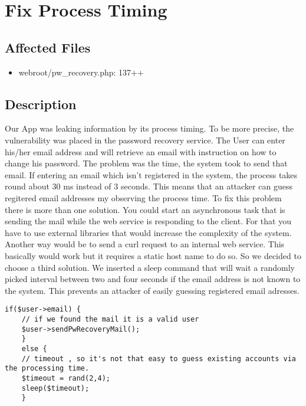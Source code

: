 \chapter{Fix Process Timing}
\section{Affected Files}
\begin{itemize}
	\item webroot/pw\_recovery.php: 137++
\end{itemize}
\section{Description}

Our App was leaking information by its process timing. To be more precise, the vulnerability was placed in the password recovery service. The User can enter his/her email address and will retrieve an email with instruction on how to change his password. The problem was the time, the system took to send that email. If entering an email which isn't registered in the system, the process takes round about 30 ms instead of 3 seconds. This means that an attacker can guess regitered email addresses my observing the process time. To fix this problem there is more than one solution. You could start an asynchronous task that is sending the mail while the web service is responding to the client. For that you have to use external libraries that would increase the complexity of the system. Another way would be to send a curl request to an internal web service. This basically would work but it requires a static host name to do so. So we decided to choose a third solution. We inserted a sleep command that will wait a randomly picked interval between two and four seconds if the email address is not known to the system. This prevents an attacker of easily guessing registered email adresses.

\begin{lstlisting}[caption=Random Timeout in pw\_recovery.php,label=listing:timeout]
	if($user->email) {
	// if we found the mail it is a valid user
	$user->sendPwRecoveryMail();
	}
	else {
	// timeout , so it's not that easy to guess existing accounts via the processing time.
	$timeout = rand(2,4);
	sleep($timeout);
	}
\end{lstlisting}